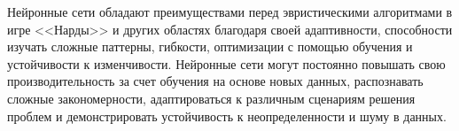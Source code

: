 Нейронные сети обладают преимуществами перед эвристическими алгоритмами в игре <<Нарды>> и других областях благодаря своей адаптивности, способности изучать сложные паттерны, гибкости, оптимизации с помощью обучения и устойчивости к изменчивости. Нейронные сети могут постоянно повышать свою производительность за счет обучения на основе новых данных, распознавать сложные закономерности, адаптироваться к различным сценариям решения проблем и демонстрировать устойчивость к неопределенности и шуму в данных.
